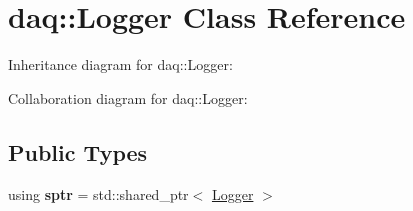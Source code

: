 \hypertarget{classdaq_1_1Logger}{}\section{daq\+:\+:Logger Class Reference}
\label{classdaq_1_1Logger}


Inheritance diagram for daq\+:\+:Logger\+:


Collaboration diagram for daq\+:\+:Logger\+:
\subsection*{Public Types}
\begin{DoxyCompactItemize}
\item 
\mbox{\label{classdaq_1_1Logger_a95175e139c9258e4dd68c7e0827e8af5}} 
using {\bfseries sptr} = std\+::shared\+\_\+ptr$<$ \hyperlink{classdaq_1_1Logger}{Logger} $>$
\end{DoxyCompactItemize}
